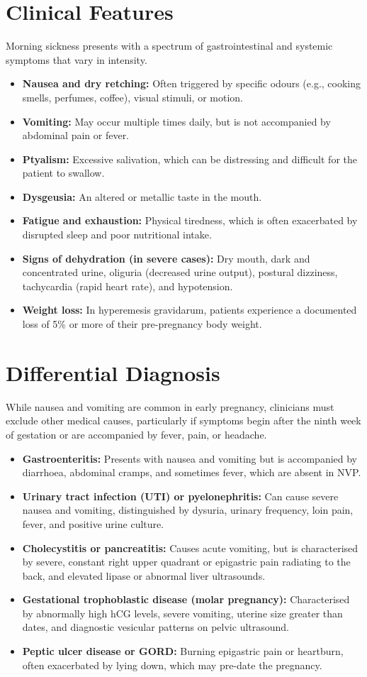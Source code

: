 \section*{Clinical Features}
Morning sickness presents with a spectrum of gastrointestinal and systemic symptoms that vary in intensity.
\begin{itemize}
    \item \textbf{Nausea and dry retching:} Often triggered by specific odours (e.g., cooking smells, perfumes, coffee), visual stimuli, or motion.
    \item \textbf{Vomiting:} May occur multiple times daily, but is not accompanied by abdominal pain or fever.
    \item \textbf{Ptyalism:} Excessive salivation, which can be distressing and difficult for the patient to swallow.
    \item \textbf{Dysgeusia:} An altered or metallic taste in the mouth.
    \item \textbf{Fatigue and exhaustion:} Physical tiredness, which is often exacerbated by disrupted sleep and poor nutritional intake.
    \item \textbf{Signs of dehydration (in severe cases):} Dry mouth, dark and concentrated urine, oliguria (decreased urine output), postural dizziness, tachycardia (rapid heart rate), and hypotension.
    \item \textbf{Weight loss:} In hyperemesis gravidarum, patients experience a documented loss of 5\% or more of their pre-pregnancy body weight.
\end{itemize}

\section*{Differential Diagnosis}
While nausea and vomiting are common in early pregnancy, clinicians must exclude other medical causes, particularly if symptoms begin after the ninth week of gestation or are accompanied by fever, pain, or headache.
\begin{itemize}
    \item \textbf{Gastroenteritis:} Presents with nausea and vomiting but is accompanied by diarrhoea, abdominal cramps, and sometimes fever, which are absent in NVP.
    \item \textbf{Urinary tract infection (UTI) or pyelonephritis:} Can cause severe nausea and vomiting, distinguished by dysuria, urinary frequency, loin pain, fever, and positive urine culture.
    \item \textbf{Cholecystitis or pancreatitis:} Causes acute vomiting, but is characterised by severe, constant right upper quadrant or epigastric pain radiating to the back, and elevated lipase or abnormal liver ultrasounds.
    \item \textbf{Gestational trophoblastic disease (molar pregnancy):} Characterised by abnormally high hCG levels, severe vomiting, uterine size greater than dates, and diagnostic vesicular patterns on pelvic ultrasound.
    \item \textbf{Peptic ulcer disease or GORD:} Burning epigastric pain or heartburn, often exacerbated by lying down, which may pre-date the pregnancy.
\end{itemize}

